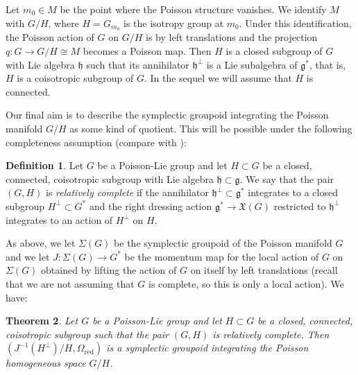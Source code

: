 \documentclass[a4paper,11pt]{amsart}
\newtheorem{thm}{Theorem}[section]
\theoremstyle{definition}
\newtheorem{defn}[thm]{Definition}
\theoremstyle{remark}
\begin{document}
Let $m_0\in M$ be the point where the Poisson structure vanishes. We identify $M$ with $G/H$, where $H=G_{m_0}$
is the isotropy group at $m_0$. Under this identification, the Poisson action of $G$ on $G/H$ is by left
translations and the projection $q:G\to G/H\cong M$ becomes a Poisson map. Then $H$ is a closed subgroup of $G$
with Lie algebra ${\mathfrak{h}}$ such that its annihilator ${\mathfrak{h}}^\perp$ is a Lie subalgebra of ${\mathfrak{g}} ^*$, that is, $H$ is a
coisotropic subgroup of $G$. In the sequel we will assume that $H$ is connected.

Our final aim is to describe the symplectic groupoid integrating the Poisson
manifold $G/H$ as some kind of quotient. This will be possible under the following
completeness assumption (compare with \cite{BCST}):

\begin{defn}
Let $G$ be a Poisson-Lie group and let $H\subset G$ be a closed,
connected, coisotropic subgroup with Lie algebra ${\mathfrak{h}}\subset{\mathfrak{g}}$.
We say that the pair $(G,H)$ is \emph{relatively complete} if
the annihilator ${\mathfrak{h}}^\perp\subset{\mathfrak{g}}^*$ integrates to a closed
subgroup $H^\perp\subset G^*$ and the right dressing action
${\mathfrak{g}}^*\to {\ensuremath{\mathfrak{X}}}(G)$ restricted to ${\mathfrak{h}}^\perp$ integrates to an action
of $H^\perp$ on $H$.
\end{defn}

As above, we let $\Sigma(G)$ be the symplectic groupoid of the Poisson manifold $G$ and we let $J:\Sigma(G)\to
G^*$ be the momentum map for the local action of $G$ on $\Sigma(G)$ obtained by lifting the action of $G$ on
itself by left translations (recall that we are not assuming that $G$ is complete, so this is only a local
action). We have:

\begin{thm}
\label{thm:Poisson:hom}
Let $G$ be a Poisson-Lie group and let $H\subset G$ be a
closed, connected, coisotropic subgroup such that the pair $(G,H)$
is relatively complete. Then $(J^{-1}(H^\perp )/H,\Omega _\operatorname{red})$
is a symplectic groupoid integrating the Poisson homogeneous space
$G/H$.
\end{thm}
\end{document}
